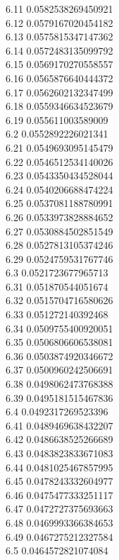 {6.11	0.0582538269450921\\
6.12	0.0579167020454182\\
6.13	0.0575815347147362\\
6.14	0.0572483135099792\\
6.15	0.0569170270558557\\
6.16	0.0565876640444372\\
6.17	0.0562602132347499\\
6.18	0.0559346634523679\\
6.19	0.055611003589009\\
6.2	0.0552892226021341\\
6.21	0.0549693095145479\\
6.22	0.0546512534140026\\
6.23	0.0543350434528044\\
6.24	0.0540206688474224\\
6.25	0.0537081188780991\\
6.26	0.0533973828884652\\
6.27	0.0530884502851549\\
6.28	0.0527813105374246\\
6.29	0.0524759531767746\\
6.3	0.0521723677965713\\
6.31	0.051870544051674\\
6.32	0.0515704716580626\\
6.33	0.051272140392468\\
6.34	0.0509755400920051\\
6.35	0.0506806606538081\\
6.36	0.0503874920346672\\
6.37	0.0500960242506691\\
6.38	0.0498062473768388\\
6.39	0.0495181515467836\\
6.4	0.0492317269523396\\
6.41	0.0489469638432207\\
6.42	0.0486638525266689\\
6.43	0.0483823833671083\\
6.44	0.0481025467857995\\
6.45	0.0478243332604977\\
6.46	0.0475477333251117\\
6.47	0.0472727375693663\\
6.48	0.0469993366384653\\
6.49	0.0467275212327584\\
6.5	0.0464572821074084\\
}
